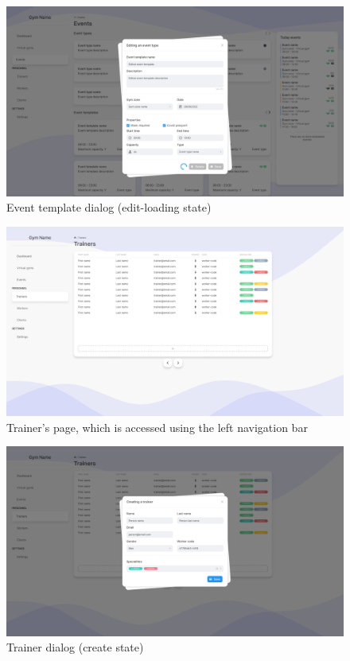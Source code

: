 \documentclass[a4paper, 12pt, oneside]{book}
\begin{document}
\begin{figure}[h!]
	\centering
	\includegraphics[width=\textwidth]{assets/ui/EventTemplateEditLoading.png}
	\caption{Event template dialog (edit-loading state)}
\end{figure}
\begin{figure}[h!]
	\centering
	\includegraphics[width=\textwidth]{assets/ui/Trainers.png}
	\caption{Trainer's page, which is accessed using the left navigation bar}
\end{figure}
\begin{figure}[h!]
	\centering
	\includegraphics[width=\textwidth]{assets/ui/TrainerCreate.png}
	\caption{Trainer dialog (create state)}
\end{figure}
\end{document}
